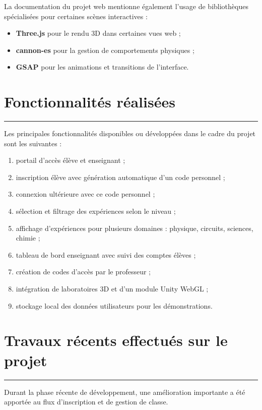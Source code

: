 \documentclass[12pt,a4paper]{report}
\newcommand{\sectionline}{
  \vspace{0.3em}
  \noindent\color{mainline}\rule{\textwidth}{1.5pt}
  \vspace{0.6em}
}
\begin{document}
La documentation du projet web mentionne également l'usage de bibliothèques spécialisées
pour certaines scènes interactives :

\begin{itemize}[leftmargin=1.2cm]
  \item \textbf{Three.js} pour le rendu 3D dans certaines vues web ;
  \item \textbf{cannon-es} pour la gestion de comportements physiques ;
  \item \textbf{GSAP} pour les animations et transitions de l'interface.
\end{itemize}

\section{Fonctionnalités réalisées}

\sectionline

Les principales fonctionnalités disponibles ou développées dans le cadre du projet sont les suivantes :

\begin{enumerate}[leftmargin=1.2cm]
  \item portail d'accès élève et enseignant ;
  \item inscription élève avec génération automatique d'un code personnel ;
  \item connexion ultérieure avec ce code personnel ;
  \item sélection et filtrage des expériences selon le niveau ;
  \item affichage d'expériences pour plusieurs domaines : physique, circuits, sciences, chimie ;
  \item tableau de bord enseignant avec suivi des comptes élèves ;
  \item création de codes d'accès par le professeur ;
  \item intégration de laboratoires 3D et d'un module Unity WebGL ;
  \item stockage local des données utilisateurs pour les démonstrations.
\end{enumerate}

\section{Travaux récents effectués sur le projet}

\sectionline

Durant la phase récente de développement, une amélioration importante a été apportée au flux
d'inscription et de gestion de classe.
\end{document}
